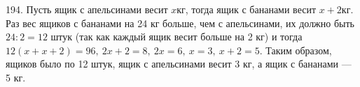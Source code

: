 194. Пусть ящик с апельсинами весит $x$кг, тогда ящик с бананами весит $x+2$кг. Раз вес ящиков с бананами на 24 кг больше, чем с апельсинами, их должно быть $24:2=12$ штук (так как каждый ящик весит больше на 2 кг) и тогда $12(x+x+2)=96,\ 2x+2=8,\ 2x=6,\ x=3,\ x+2=5.$ Таким образом, ящиков было по 12 штук, ящик с апельсинами весит 3 кг, а ящик с бананами --- 5 кг.\\
